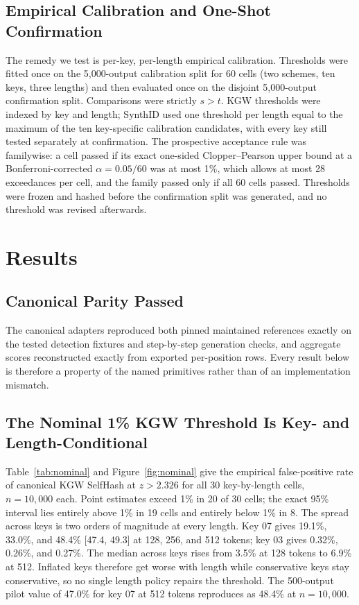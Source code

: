 \documentclass[conference]{IEEEtran}
\begin{document}
\subsection{Empirical Calibration and One-Shot Confirmation}
\label{sec:calib}

The remedy we test is per-key, per-length empirical calibration. Thresholds were
fitted once on the 5,000-output calibration split for 60 cells (two schemes, ten
keys, three lengths) and then evaluated once on the disjoint 5,000-output
confirmation split. Comparisons were strictly $s>t$. KGW thresholds were indexed
by key and length; SynthID used one threshold per length equal to the maximum of
the ten key-specific calibration candidates, with every key still tested
separately at confirmation. The prospective acceptance rule was familywise: a cell
passed if its exact one-sided Clopper--Pearson upper bound at a Bonferroni-corrected
$\alpha=0.05/60$ \citep{dunn1961multiple} was at most 1\%, which allows at most 28 exceedances per cell, and the family passed
only if all 60 cells passed. Thresholds were frozen and hashed before the
confirmation split was generated, and no threshold was revised afterwards.

\section{Results}

\subsection{Canonical Parity Passed}

The canonical adapters reproduced both pinned maintained references exactly on the
tested detection fixtures and step-by-step generation checks, and aggregate scores
reconstructed exactly from exported per-position rows. Every result below is
therefore a property of the named primitives rather than of an implementation
mismatch.

\subsection{The Nominal 1\% KGW Threshold Is Key- and Length-Conditional}
\label{sec:c1}

Table~\ref{tab:nominal} and Figure~\ref{fig:nominal} give the empirical
false-positive rate of canonical KGW SelfHash at $z>2.326$ for all 30 key-by-length
cells, $n=10{,}000$ each. Point estimates exceed 1\% in 20 of 30 cells; the exact
95\% interval lies entirely above 1\% in 19 cells and entirely below 1\% in 8. The
spread across keys is two orders of magnitude at every length. Key 07 gives
19.1\%, 33.0\%, and 48.4\% [47.4, 49.3] at 128, 256, and 512 tokens; key 03 gives
0.32\%, 0.26\%, and 0.27\%. The median across keys rises from 3.5\% at 128 tokens
to 6.9\% at 512. Inflated keys therefore get worse with length while conservative
keys stay conservative, so no single length policy repairs the threshold. The
500-output pilot value of 47.0\% for key 07 at 512 tokens reproduces as 48.4\% at
$n=10{,}000$.
\end{document}
